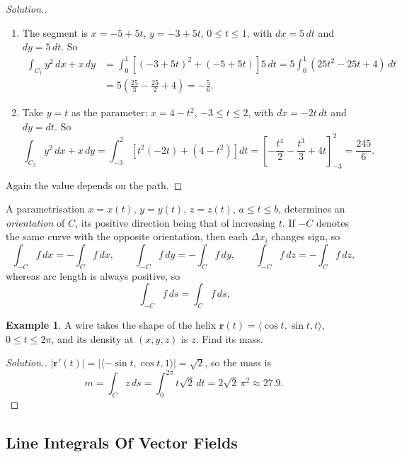 \documentclass[11pt,a4paper]{article}
\theoremstyle{definition}
\newtheorem{exa}[thm]{Example}
\newenvironment{solution}
  {\renewcommand{\qedsymbol}{}\begin{proof}[\textit{Solution}.]}
  {\end{proof}}
\begin{document}
\begin{solution}
\begin{enumerate}
\item The segment is $x = -5 + 5t$, $y = -3 + 5t$, $0\leq t \leq 1$, with
$dx = 5\,dt$ and $dy = 5\,dt$. So
\begin{align*}
\int_{C_1} y^2\,dx + x\,dy & = \int^1_0 \left[(-3 + 5t)^2 + (-5 + 5t)\right]5\,
dt = 5 \int^1_0 (25t^2 - 25t + 4) \,dt\\
& = 5\left(\frac{25}{3} - \frac{25}{2} + 4\right) = -\frac{5}{6} .
\end{align*}

\item Take $y = t$ as the parameter: $x = 4 - t^2$, $-3\leq t\leq 2$, with
$dx = -2t\,dt$ and $dy = dt$. So
\[\int_{C_2} y^2\,dx + x\,dy = \int_{-3}^2\left[t^2(-2t) + (4 - t^2)\right]dt =
\left[-\frac{t^4}{2} - \frac{t^3}{3} + 4t\right]_{-3}^2 = \frac{245}{6} .\]
\end{enumerate}
Again the value depends on the path.
\end{solution}

A parametrisation $x = x(t)$, $y = y(t)$, $z = z(t)$, $a\leq t \leq b$,
determines an \emph{orientation} of $C$, its positive direction being that of
increasing $t$. If $-C$ denotes the same curve with the opposite orientation,
then each $\Delta x_i$ changes sign, so
\[\int_{-C} f\,dx = -\int_C f\,dx ,\qquad \int_{-C} f\,dy = -\int_C f\,dy ,\qquad
\int_{-C} f\,dz = -\int_C f\,dz ,\]
whereas arc length is always positive, so
\[\int_{-C}f\,ds = \int_C f\,ds .\]

\begin{exa}
\label{ex:wiremass}
A wire takes the shape of the helix $\mathbf r(t) = \langle\cos t, \sin t,
t\rangle$, $0\leq t\leq 2\pi$, and its density at $(x,y,z)$ is $z$. Find its
mass.
\end{exa}

\begin{solution}
$|\mathbf r'(t)| = |\langle -\sin t,\cos t, 1\rangle| = \sqrt2$, so the mass is
\[m = \int_C z\,ds = \int_0^{2\pi} t\sqrt2\,dt = 2\sqrt2\,\pi^2\approx 27.9 .\]
\end{solution}


{\color[wave]{485}\subsection{Line Integrals Of Vector Fields}}
\end{document}
